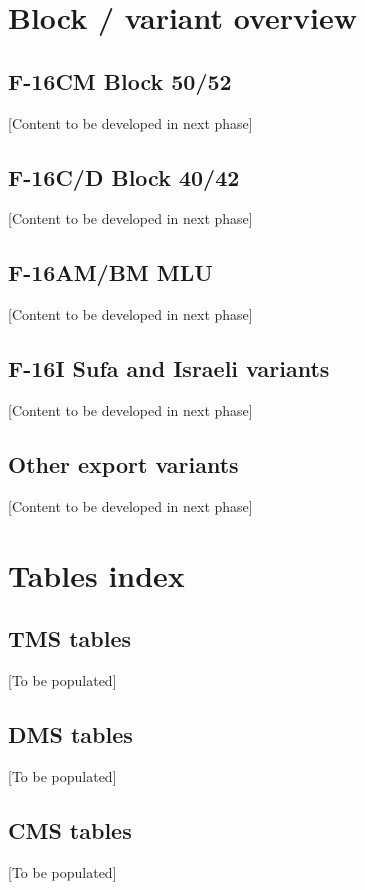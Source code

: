 \documentclass[11pt,a4paper]{article}
\begin{document}
\appendix

\section{Block / variant overview}

\subsection{F-16CM Block 50/52}

[Content to be developed in next phase]

\subsection{F-16C/D Block 40/42}

[Content to be developed in next phase]

\subsection{F-16AM/BM MLU}

[Content to be developed in next phase]

\subsection{F-16I Sufa and Israeli variants}

[Content to be developed in next phase]

\subsection{Other export variants}

[Content to be developed in next phase]

\section{Tables index}

\subsection{TMS tables}

[To be populated]

\subsection{DMS tables}

[To be populated]

\subsection{CMS tables}

[To be populated]
\end{document}
